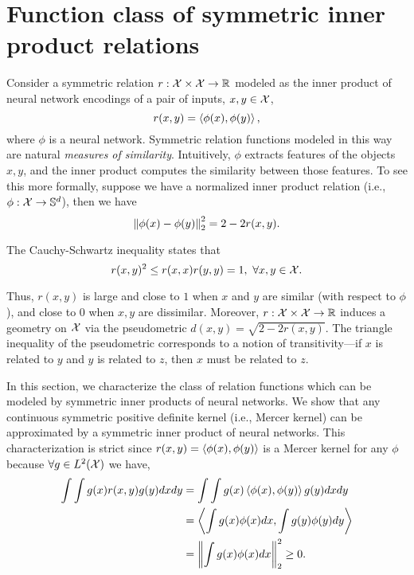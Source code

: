 \section{Function class of symmetric inner product relations}\label{sec:symmetric_relations}

Consider a symmetric relation $r: {\mathcal{X}} \times {\mathcal{X}} \to \mathbb{R}$ modeled as the inner product of neural network encodings of a pair of inputs, $x, y \in {\mathcal{X}}$,
\begin{equation}\label{eq:symmetric_iprod_relation}
    r(x, y) = \iprod{\phi(x)}{\phi(y)},
\end{equation}
where $\phi$ is a neural network. Symmetric relation functions modeled in this way are natural \textit{measures of similarity}. Intuitively, $\phi$ extracts features of the objects $x,y$, and the inner product computes the similarity between those features. To see this more formally, suppose we have a normalized inner product relation (i.e., $\phi: {\mathcal{X}} \to {\mathbb{S}}^{d}$), then we have
\begin{equation}
    \twonorm{\phi(x) - \phi(y)}^2 = 2 - 2 r(x, y).
\end{equation}

The Cauchy-Schwartz inequality states that
\begin{equation}
    r(x, y)^2 \leq r(x, x) r(y, y) = 1, \ \forall x, y \in \calX.
\end{equation}

Thus, $r(x,y)$ is large and close to $1$ when $x$ and $y$ are similar (with respect to $\phi$), and close to $0$ when $x, y$ are dissimilar. Moreover, $r: {\mathcal{X}} \times {\mathcal{X}} \to \mathbb{R}$ induces a geometry on ${\mathcal{X}}$ via the pseudometric $d(x,y) = \sqrt{2 - 2 r(x,y)}$. The triangle inequality of the pseudometric corresponds to a notion of transitivity---if $x$ is related to $y$ and $y$ is related to $z$, then $x$ must be related to $z$.

In this section, we characterize the class of relation functions which can be modeled by symmetric inner products of neural networks. We show that any continuous symmetric positive definite kernel (i.e., Mercer kernel) can be approximated by a symmetric inner product of neural networks. This characterization is strict since $r(x,y) = \left \langle \phi(x), \phi(y) \right\rangle$ is a Mercer kernel for any $\phi$ because $\forall g \in L^2({\mathcal{X}})$ we have,
\begin{equation*}
    \begin{split}
        \int \int g(x) r(x,y) g(y) dx dy &= \int \int g(x) \iprod{\phi(x)}{\phi(y)} g(y) dx dy \\
        &= \iprod{\int g(x) \phi(x) dx}{\int g(y) \phi(y) dy} \\
        &= \twonorm{\int g(x) \phi(x) dx}^2 \geq 0.
    \end{split}
\end{equation*}

